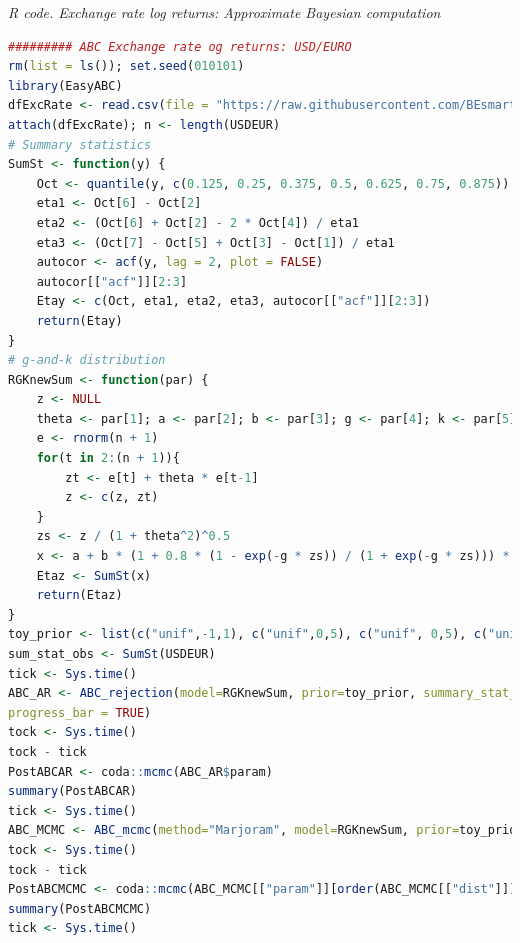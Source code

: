 \begin{tcolorbox}[enhanced,width=4.67in,center upper,
	fontupper=\large\bfseries,drop shadow southwest,sharp corners]
	\textit{R code. Exchange rate log returns: Approximate Bayesian computation}
	\begin{VF}
		\begin{lstlisting}[language=R]
######### ABC Exchange rate og returns: USD/EURO
rm(list = ls()); set.seed(010101)
library(EasyABC)
dfExcRate <- read.csv(file = "https://raw.githubusercontent.com/BEsmarter-consultancy/BSTApp/refs/heads/master/DataApp/ExchangeRate.csv", sep = ",", header = T)
attach(dfExcRate); n <- length(USDEUR)
# Summary statistics
SumSt <- function(y) {
	Oct <- quantile(y, c(0.125, 0.25, 0.375, 0.5, 0.625, 0.75, 0.875))
	eta1 <- Oct[6] - Oct[2]
	eta2 <- (Oct[6] + Oct[2] - 2 * Oct[4]) / eta1
	eta3 <- (Oct[7] - Oct[5] + Oct[3] - Oct[1]) / eta1
	autocor <- acf(y, lag = 2, plot = FALSE)
	autocor[["acf"]][2:3]
	Etay <- c(Oct, eta1, eta2, eta3, autocor[["acf"]][2:3])
	return(Etay)
}
# g-and-k distribution
RGKnewSum <- function(par) {
	z <- NULL
	theta <- par[1]; a <- par[2]; b <- par[3]; g <- par[4]; k <- par[5]
	e <- rnorm(n + 1)
	for(t in 2:(n + 1)){
		zt <- e[t] + theta * e[t-1]
		z <- c(z, zt)
	}
	zs <- z / (1 + theta^2)^0.5
	x <- a + b * (1 + 0.8 * (1 - exp(-g * zs)) / (1 + exp(-g * zs))) * (1 + zs^2)^k * zs
	Etaz <- SumSt(x)
	return(Etaz)
}
toy_prior <- list(c("unif",-1,1), c("unif",0,5), c("unif", 0,5), c("unif", -5,5), c("unif", -0.5,5))
sum_stat_obs <- SumSt(USDEUR)
tick <- Sys.time()
ABC_AR <- ABC_rejection(model=RGKnewSum, prior=toy_prior, summary_stat_target = sum_stat_obs, nb_simul=150000, tol = 0.0067,
progress_bar = TRUE)
tock <- Sys.time()
tock - tick
PostABCAR <- coda::mcmc(ABC_AR$param)
summary(PostABCAR)
tick <- Sys.time()
ABC_MCMC <- ABC_mcmc(method="Marjoram", model=RGKnewSum, prior=toy_prior, summary_stat_target=sum_stat_obs, n_rec = 100000, progress_bar = TRUE)
tock <- Sys.time()
tock - tick
PostABCMCMC <- coda::mcmc(ABC_MCMC[["param"]][order(ABC_MCMC[["dist"]])[1:1000],])
summary(PostABCMCMC)
tick <- Sys.time()
\end{lstlisting}
	\end{VF}
\end{tcolorbox}

